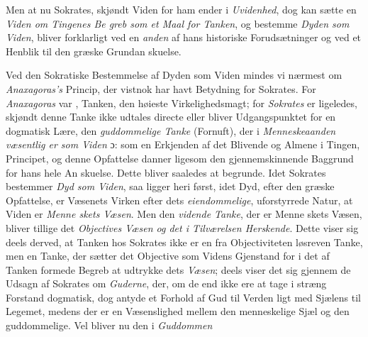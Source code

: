 Men at nu Sokrates, skjøndt Viden for ham ender i
\emph{Uvidenhed}, dog kan sætte en \emph{Viden om Tingenes Be\-%
greb som et Maal for Tanken}, og bestemme \emph{Dyden som
Viden}, bliver forklarligt ved en \emph{anden} af hans historiske
Forudsætninger og ved et Henblik til den græske Grundan\-%
skuelse.

Ved den Sokratiske Bestemmelse af Dyden som Viden
mindes vi nærmest om \emph{Anaxagoras's} Princip, der vistnok
har havt Betydning for Sokrates. For \emph{Anaxagoras} var
, Tanken, den høieste Virkelighedsmagt; for \emph{Sokrates} er
ligeledes, skjøndt denne Tanke ikke udtales directe eller bliver
Udgangspunktet for en dogmatisk Lære, den \emph{guddommelige
Tanke} (Fornuft), der i \emph{Menneskeaanden væsentlig
er som Viden} ɔ: som en Erkjenden af det Blivende og
Almene i Tingen, Principet, og denne Opfattelse danner
ligesom den gjennemskinnende Baggrund for hans hele An\-%
skuelse. Dette bliver saaledes at begrunde. Idet Sokrates
bestemmer \emph{Dyd som Viden}, saa ligger heri først, idet Dyd,
efter den græske Opfattelse, er Væsenets Virken efter dets
\emph{eiendommelige}, uforstyrrede Natur, at Viden er \emph{Menne\-%
skets Væsen}. Men den \emph{vidende Tanke}, der er Menne\-%
skets Væsen, bliver tillige det \emph{Objectives Væsen og det i
Tilværelsen Herskende}. Dette viser sig deels derved, at
Tanken hos Sokrates ikke er en fra Objectiviteten løsreven Tanke,
men en Tanke, der sætter det Objective som Videns Gjenstand for i
det af Tanken formede Begreb at udtrykke dets \emph{Væsen}; deels
\setcounter{footnote}{0}
viser det sig gjennem de Udsagn af Sokrates om \emph{Guderne},
der, om de end ikke ere at tage i stræng Forstand dogmatisk,
dog antyde et Forhold af Gud til Verden ligt med Sjælens til
Legemet, medens der er en Væsenslighed mellem den menneskelige
Sjæl og den guddommelige. Vel bliver nu den i \emph{Guddommen}
